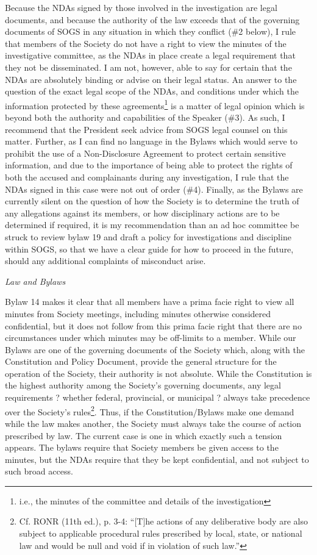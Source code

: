 \begin{longenum}[ label*=\arabic*., align=left]
\begin{longenum}
Because the NDAs signed by those involved in the investigation are legal documents, and because the authority of the law exceeds that of the governing documents of SOGS in any situation in which they conflict (\#2 below), I rule that members of the Society do not have a right to view the minutes of the investigative committee, as the NDAs in place create a legal requirement that they not be disseminated.
I am not, however, able to say for certain that the NDAs are absolutely binding or advise on their legal status. An answer to the question of the exact legal scope of the NDAs, and conditions under which the information protected by these agreements\footnote{i.e., the minutes of the committee and details of the investigation}  is a matter of legal opinion which is beyond both the authority and capabilities of the Speaker (\#3). As such, I recommend that the President seek advice from SOGS legal counsel on this matter.
Further, as I can find no language in the Bylaws which would serve to prohibit the use of a Non-Disclosure Agreement to protect certain sensitive information, and due to the importance of being able to protect the rights of both the accused and complainants during any investigation, I rule that the NDAs signed in this case were not out of order (\#4).
Finally, as the Bylaws are currently silent on the question of how the Society is to determine the truth of any allegations against its members, or how disciplinary actions are to be determined if required, it is my recommendation than an ad hoc committee be struck to review bylaw 19 and draft a policy for investigations and discipline within SOGS, so that we have a clear guide for how to proceed in the future, should any additional complaints of misconduct arise.

\item \textit{Law and Bylaws}

Bylaw 14 makes it clear that all members have a prima facie right to view all minutes from Society meetings, including minutes otherwise considered confidential, but it does not follow from this prima facie right that there are no circumstances under which minutes may be off-limits to a member.
While our Bylaws are one of the governing documents of the Society which, along with the Constitution and Policy Document, provide the general structure for the operation of the Society, their authority is not absolute. While the Constitution is the highest authority among the Society's governing documents, any legal requirements ? whether federal, provincial, or municipal ? always take precedence over the Society's rules\footnote{Cf. RONR (11th ed.), p. 3-4: ``[T]he actions of any deliberative body are also subject to applicable procedural rules prescribed by local, state, or national law and would be null and void if in violation of such law.''}.  Thus, if the Constitution/Bylaws make one demand while the law makes another, the Society must always take the course of action prescribed by law.
The current case is one in which exactly such a tension appears. The bylaws require that Society members be given access to the minutes, but the NDAs require that they be kept confidential, and not subject to such broad access.


\end{longenum}
\end{longenum}
